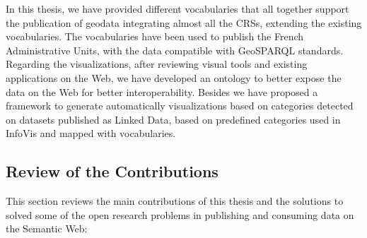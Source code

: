 In this thesis, we have provided different vocabularies that all together support the publication of geodata integrating almost all the CRSs, extending the existing vocabularies. The vocabularies have been used to publish the French Administrative Units, with the data compatible with GeoSPARQL standards. Regarding the visualizations, after reviewing visual tools and existing applications on the Web, we have developed an ontology to better expose the data on the Web for better interoperability. Besides we have proposed a framework to generate automatically visualizations based on categories detected on datasets published as Linked Data, based on predefined categories used in InfoVis and mapped with vocabularies. 

\subsection{Review of the Contributions}
This section reviews the main contributions of this thesis and the solutions to solved some of the open research problems in publishing and consuming data on the Semantic Web:

